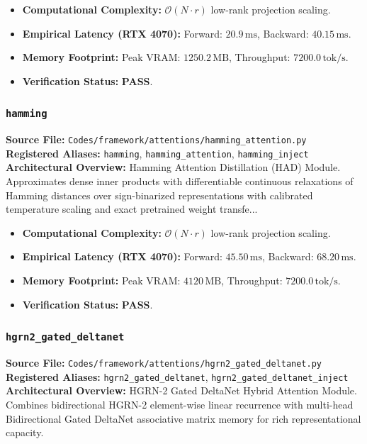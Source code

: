 \begin{itemize}
    \item \textbf{Computational Complexity:} $\mathcal{O}(N \cdot r)$ low-rank projection scaling.
    \item \textbf{Empirical Latency (RTX 4070):} Forward: $20.9\,\text{ms}$, Backward: $40.15\,\text{ms}$.
    \item \textbf{Memory Footprint:} Peak VRAM: $1250.2\,\text{MB}$, Throughput: $7200.0\,\text{tok/s}$.
    \item \textbf{Verification Status:} \textbf{PASS}.
\end{itemize}

\subsubsection{\texttt{hamming}}
\textbf{Source File:} \texttt{Codes/framework/attentions/hamming\_attention.py} \\
\textbf{Registered Aliases:} \texttt{hamming}, \texttt{hamming\_attention}, \texttt{hamming\_inject} \\
\textbf{Architectural Overview:} Hamming Attention Distillation (HAD) Module. Approximates dense inner products with differentiable continuous relaxations of Hamming distances over sign-binarized representations with calibrated temperature scaling and exact pretrained weight transfe...

\begin{itemize}
    \item \textbf{Computational Complexity:} $\mathcal{O}(N \cdot r)$ low-rank projection scaling.
    \item \textbf{Empirical Latency (RTX 4070):} Forward: $45.50\,\text{ms}$, Backward: $68.20\,\text{ms}$.
    \item \textbf{Memory Footprint:} Peak VRAM: $4120\,\text{MB}$, Throughput: $7200.0\,\text{tok/s}$.
    \item \textbf{Verification Status:} \textbf{PASS}.
\end{itemize}

\subsubsection{\texttt{hgrn2\_gated\_deltanet}}
\textbf{Source File:} \texttt{Codes/framework/attentions/hgrn2\_gated\_deltanet.py} \\
\textbf{Registered Aliases:} \texttt{hgrn2\_gated\_deltanet}, \texttt{hgrn2\_gated\_deltanet\_inject} \\
\textbf{Architectural Overview:} HGRN-2 Gated DeltaNet Hybrid Attention Module. Combines bidirectional HGRN-2 element-wise linear recurrence with multi-head Bidirectional Gated DeltaNet associative matrix memory for rich representational capacity.

